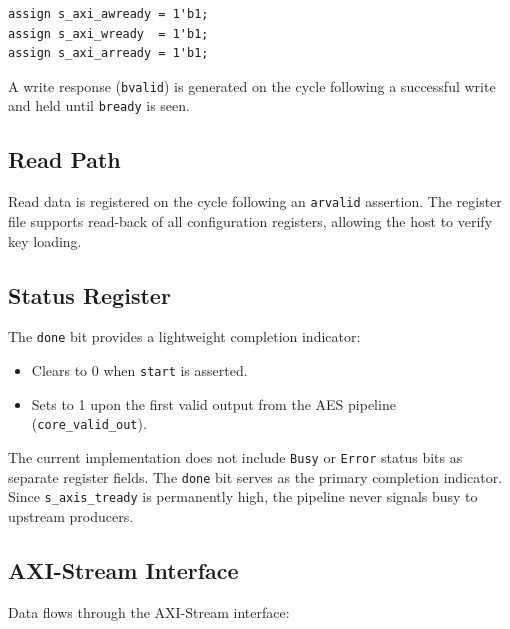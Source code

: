 \documentclass[12pt,a4paper]{article}
\begin{document}
\begin{lstlisting}[caption={Always-ready AXI4-Lite handshake}]
assign s_axi_awready = 1'b1;
assign s_axi_wready  = 1'b1;
assign s_axi_arready = 1'b1;
\end{lstlisting}

A write response (\texttt{bvalid}) is generated on the cycle following a
successful write and held until \texttt{bready} is seen.

\subsection{Read Path}

Read data is registered on the cycle following an \texttt{arvalid} assertion.
The register file supports read-back of all configuration registers,
allowing the host to verify key loading.

\subsection{Status Register}

The \texttt{done} bit provides a lightweight completion indicator:
\begin{itemize}[nosep]
  \item Clears to 0 when \texttt{start} is asserted.
  \item Sets to 1 upon the first valid output from the AES pipeline
        (\texttt{core\_valid\_out}).
\end{itemize}

\begin{warningbox}
The current implementation does not include \texttt{Busy} or \texttt{Error}
status bits as separate register fields. The \texttt{done} bit serves as the
primary completion indicator. Since \texttt{s\_axis\_tready} is permanently
high, the pipeline never signals busy to upstream producers.
\end{warningbox}

\subsection{AXI-Stream Interface}

Data flows through the AXI-Stream interface:
\end{document}
